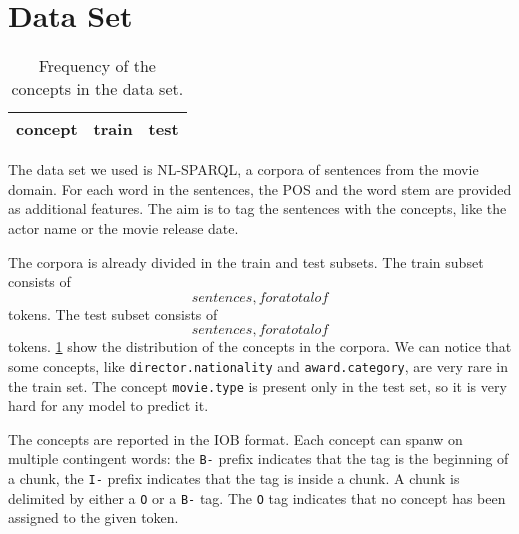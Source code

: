 \section{Data Set}
\label{sec:dataset}

\begin{table}[t!]
	\centering
    \begin{tabular}{ l l l }
    	\toprule
    		\multicolumn{1}{l}{concept} & \multicolumn{1}{l}{train} & \multicolumn{1}{c}{test} \\
    	\midrule
            
    	\bottomrule
	\end{tabular}
    \caption{Frequency of the concepts in the data set.}
	\label{tab:frequencies}
\end{table}

The data set we used is NL-SPARQL, a corpora of sentences from the movie domain.
For each word in the sentences, the \ac{POS} and the word stem are provided as additional features.
The aim is to tag the sentences with the concepts, like the actor name or the movie release date.

The corpora is already divided in the train and test subsets.
The train subset consists of $$ sentences,
for a total of $$ tokens.
The test subset consists of $$ sentences,
for a total of $$ tokens.
\cref{tab:frequencies} show the distribution of the concepts in the corpora.
We can notice that some concepts, like \texttt{director.nationality} and \texttt{award.category},
are very rare in the train set.
The concept \texttt{movie.type} is present only in the test set, so it is very hard for any model to predict it.

The concepts are reported in the \ac{IOB} format.
Each concept can spanw on multiple contingent words:
the \texttt{B-} prefix indicates that the tag is the beginning of a chunk,
the \texttt{I-} prefix indicates that the tag is inside a chunk.
A chunk is delimited by either a \texttt{O} or a \texttt{B-} tag.
The \texttt{O} tag indicates that no concept has been assigned to the given token.
